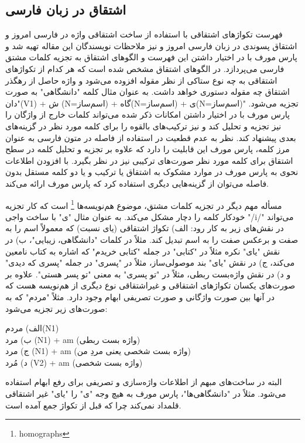 \documentclass[12pt,onecolumn,a4paper]{article}
\begin{document}
    \subsection{اشتقاق در زبان فارسی}
    فهرست تکواژهای اشتقاقی با استفاده از ساخت اشتقاقی واژه در فارسی امروز {\mfo\citep{Kalbasi71}} و اشتقاق پسوندی در زبان فارسی امروز {\mfo\citep{Kashani71}} و نیز ملاحظات نویسندگان این مقاله تهیه شد و پارس مورف با در اختیار داشتن این فهرست و الگوهای اشتقاق به تجزیه کلمات مشتق فارسی می‌پردازد. در الگوهای اشتقاق مشخص شده است که هر کدام از تکواژهای اشتقاقی به چه نوع ستاکی از نظر مقوله افزوده می‌شود و واژه حاصل از رهگذر اشتقاق چه مقوله دستوری خواهد داشت. به عنوان مثال کلمه "دانشگاهی" به صورت "دان(V1) + ش (N=اسم‌ساز) + گاه(N=اسم‌ساز) + ی(N=اسم‌ساز)" تجزیه می‌شود. پارس مورف با در اختیار داشتن امکانات ذکر شده می‌تواند کلمات خارج از واژگان را نیز تجزیه و تحلیل کند و نیز ترکیب‌های بالقوه را برای کلمه مورد نظر در گزینه‌های بعدی پیشنهاد کند. نظر به عدم قطعیت در استفاده از فاصله در متون فارسی به عنوان مرز کلمه، پارس مورف این قابلیت را دارد که علاوه بر تجزیه و تحلیل کلمه در سطح اشتقاق برای کلمه مورد نظر صورت‌های ترکیبی نیز در نظر بگیرد. با افزودن اطلاعات نحوی به پارس مورف در موارد مشکوک به اشتقاق یا ترکیب و یا دو کلمه مستقل بدون فاصله می‌توان از گزینه‌هایی دیگری استفاده کرد که پارس مورف ارائه می‌کند.
    \par
    مسأله مهم دیگر در تجزیه کلمات مشتق، موضوع هم‌نویسه‌ها \footnote{homographs} است که کار تجزیه خودکار کلمه را دچار مشکل می‌کند. به عنوان مثال "ی" با ساخت واجی "/i/" می‌تواند در نقش‌های زیر به کار رود: الف) تکواژ اشتقاقی (یای نسبت) که معمولاً اسم را به صفت و برعکس صفت را به اسم تبدیل کند. مثلاً در کلمات "دانشگاهی، زیبایی"، ب) در نقش "یای" نکره مثلاً در "کتابی" در جمله "کتابی خریدم" که اشاره به کتاب نامعین می‌کند، ج) در نقش "یای" بند موصولی‌ساز، مثلاً در "پسری" در جمله "پسری که دیدی" و د) در نقش واژه‌بست ربطی، مثلاً در "تو پسری" به معنی "تو پسر هستی". علاوه بر صورت‌های یکسان تکواژهای اشتقاقی و غیراشتقاقی نوع دیگری از هم‌نویسه هست که در آنها بین صورت واژگانی و صورت تصریفی ابهام وجود دارد. مثلاً "مردم" که به صورت‌های زیر تجزیه می‌شود:
    \par
    الف) مردم(N1)
    \\
    ب) مرد (N1) + am (واژه بست ربطی)
    \\
    ج) مرد (N1) + am (واژه بست شخصی یعنی مردِ من)
    \\
    د) مُرد (V2) + am (واژه بست شخصی)
    \par
    البته در ساخت‌های مبهم از اطلاعات واژه‌سازی و تصریفی برای رفع ابهام استفاده می‌شود. مثلاً در "دانشگاهی‌ها"، پارس مورف به هیچ وجه "ی" را "یای" غیر اشتقاقی قلمداد نمی‌کند چرا که قبل از تکواژ جمع آمده است.
\end{document}
